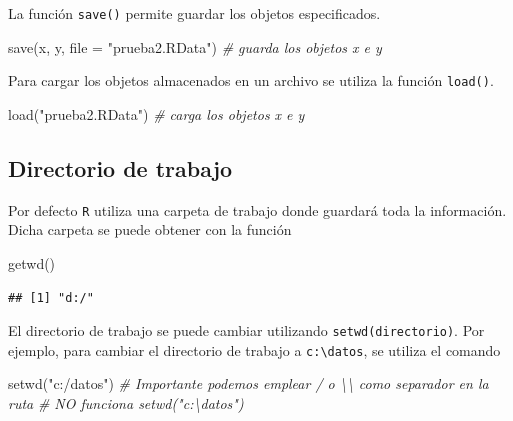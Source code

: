 \documentclass[
]{book}
\newenvironment{Shaded}{\begin{snugshade}}{\end{snugshade}}
\newcommand{\AttributeTok}[1]{\textcolor[rgb]{0.77,0.63,0.00}{#1}}
\newcommand{\CommentTok}[1]{\textcolor[rgb]{0.56,0.35,0.01}{\textit{#1}}}
\newcommand{\FunctionTok}[1]{\textcolor[rgb]{0.00,0.00,0.00}{#1}}
\newcommand{\NormalTok}[1]{#1}
\newcommand{\StringTok}[1]{\textcolor[rgb]{0.31,0.60,0.02}{#1}}
\theoremstyle{break}
\theoremstyle{nonumberplain}
\begin{document}
La función \texttt{save()} permite guardar los objetos especificados.

\begin{Shaded}
\begin{Highlighting}[]
\FunctionTok{save}\NormalTok{(x, y, }\AttributeTok{file =} \StringTok{"prueba2.RData"}\NormalTok{) }\CommentTok{\# guarda los objetos x e y}
\end{Highlighting}
\end{Shaded}

Para cargar los objetos almacenados en un archivo se utiliza la función \texttt{load()}.

\begin{Shaded}
\begin{Highlighting}[]
\FunctionTok{load}\NormalTok{(}\StringTok{"prueba2.RData"}\NormalTok{) }\CommentTok{\# carga los objetos x e y}
\end{Highlighting}
\end{Shaded}

\hypertarget{directorio-de-trabajo}{%
\subsection{Directorio de trabajo}\label{directorio-de-trabajo}}

Por defecto \texttt{R} utiliza una carpeta de trabajo donde guardará toda la información.
Dicha carpeta se puede obtener con la función

\begin{Shaded}
\begin{Highlighting}[]
\FunctionTok{getwd}\NormalTok{() }
\end{Highlighting}
\end{Shaded}

\begin{verbatim}
## [1] "d:/"
\end{verbatim}

El directorio de trabajo se puede cambiar utilizando \texttt{setwd(directorio)}.
Por ejemplo, para cambiar el directorio de trabajo a \texttt{c:\textbackslash{}datos}, se utiliza el comando

\begin{Shaded}
\begin{Highlighting}[]
\FunctionTok{setwd}\NormalTok{(}\StringTok{"c:/datos"}\NormalTok{)}
\CommentTok{\# Importante podemos emplear \textquotesingle{}/\textquotesingle{} o \textquotesingle{}\textbackslash{}\textbackslash{}\textquotesingle{} como separador en la ruta}
\CommentTok{\# NO funciona setwd("c:\textbackslash{}datos")}
\end{Highlighting}
\end{Shaded}
\end{document}
